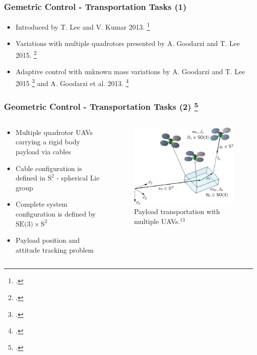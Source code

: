 \begin{frame}
	\frametitle{Gemetric Control - Transportation Tasks (1)}
	
	\begin{itemize}
		\item Introduced by T. Lee and V. Kumar 2013. \footcite{cable-load1}
		\item Variations with multiple quadrotors presented by A. Goodarzi and T. Lee 2015. \footcite{cable-load-multiple}
		\item Adaptive control with unknown mass variations by A. Goodarzi and T. Lee 2015 \footcite{flexible-cable-dynamics} and A. Goodarzi et al. 2013. \footcite{stabilization-flexible-cable}
	\end{itemize}
\end{frame}

\begin{frame}
	\frametitle{Geometric Control - Transportation Tasks (2) \footcite{Lee2014GeometricCO}}
	
	\begin{columns}
		\begin{column}{0.5\textwidth}\centering
			\begin{itemize}
				\item Multiple quadrotor UAVs carrying a rigid body payload via cables
				\item Cable configuration is defined in $\text{S}^2$ - spherical Lie group
				\item Complete system configuration is defined by $\text{SE(3)} \times \text{S}^2$
				\item Payload position and attitude tracking problem
			\end{itemize}
		\end{column}
		
		\begin{column}{0.5\textwidth}\centering
			\begin{figure}[H]
				\includegraphics[width=0.9\columnwidth]{figures/payload_carrying.png}
				\caption{Payload transportation with multiple UAVs.${}^{13}$}
				\centering
			\end{figure}
		\end{column}
	\end{columns}
		
\end{frame}
